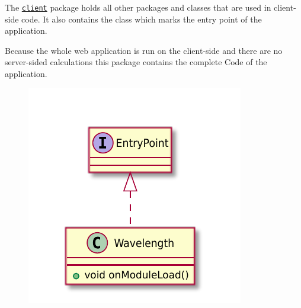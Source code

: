 The \texttt{\hyperref[pkg:edu.kit.wavelength.client]{client}} package holds all other packages and classes that are used in client-side code. 
It also contains the \texttt{} class which marks the entry point of the application.

Because the whole web application is run on the client-side and there are no server-sided calculations 
this package contains the complete Code of the application.

\begin{figure}[H]
	\centering
	\includegraphics[width=\textwidth]{packageDiagrams/clientPackage}
\end{figure}
